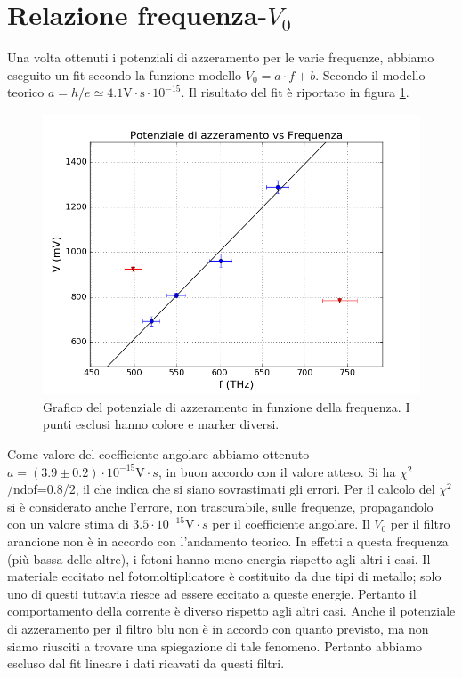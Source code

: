 \documentclass[10pt,a4paper]{article}
\begin{document}
\section{Relazione frequenza-$V_0$}
Una volta ottenuti i potenziali di azzeramento per le varie frequenze, abbiamo eseguito un fit secondo la funzione modello $V_0=a\cdot f + b$.
Secondo il modello teorico $a = h/e\simeq 4.1 \mbox{V}\cdot\mbox{s}\cdot10^{-15}$.
Il risultato del fit è riportato in figura \ref{fig:fitfinale}.
\begin{figure}[!htb]
\centering
\includegraphics[scale=0.7]{fitfinale.png}
\caption{Grafico del potenziale di azzeramento in funzione della frequenza. I punti esclusi hanno colore e marker diversi.\label{fig:fitfinale}}
\end{figure}

Come valore del coefficiente angolare abbiamo ottenuto $a = (3.9\pm 0.2)\cdot10^{-15} \mbox{V}\cdot{s}$, in buon accordo con il valore atteso.
Si ha $\chi ^2$/ndof=0.8/2, il che indica che si siano sovrastimati gli errori.
Per il calcolo del $\chi^2$ si è considerato anche l'errore, non trascurabile, sulle frequenze, propagandolo con un valore stima di $3.5\cdot 10^{-15}\mbox{V}\cdot{s}$ per il coefficiente angolare.
Il $V_0$ per il filtro arancione non è in accordo con l'andamento teorico. In effetti a questa frequenza (più bassa delle altre), i fotoni hanno meno energia rispetto agli altri i casi. Il materiale eccitato nel fotomoltiplicatore è costituito da due tipi di metallo; solo uno di questi tuttavia riesce ad essere eccitato a queste energie. Pertanto il comportamento della corrente è  diverso rispetto agli altri casi.
Anche il potenziale di azzeramento per il filtro blu non è in accordo con quanto previsto, ma non siamo riusciti a trovare una spiegazione di tale fenomeno. Pertanto abbiamo escluso dal fit lineare i dati ricavati da questi filtri.
\end{document}
